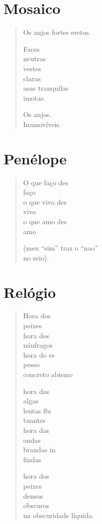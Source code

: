 \chapter{Mosaico}

\begin{verse}
Os anjos fortes eretos.

Faces\\
neutras\\
vestes\\
claras\\
asas tranquilas\\
imotas.

Os anjos.\\
Inamovíveis.
\end{verse}

\chapter{Penélope}

\begin{verse}
O que faço des\\
\qquad\qquad faço\\
o que vivo des\\
\qquad\qquad vivo\\
o que amo des\\
\qquad\qquad amo

(meu ``sim'' traz o ``nao''\\
\qquad\qquad no seio).
\end{verse}

\chapter{Relógio}

\begin{verse}
Hora dos\\
peixes\\
hora dos\\
náufragos\\
hora do es\\
pesso\\
concreto abismo

hora das\\
algas\\
lentas flu\\
tuantes\\
hora das\\
ondas\\
brandas in\\
findas

hora dos\\
peixes\\
densos\\
obscuros\\
na obscuridade líquida.
\end{verse}

